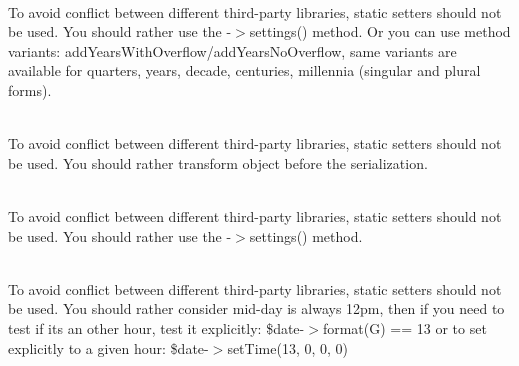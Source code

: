 \begin{DoxyRefList}
\item[Member \doxylink{interface_carbon_1_1_carbon_interface_a6b0e0698748ebda8abd75ff2f13ab6ce}{Carbon\textbackslash{}Carbon\+Interface\+::reset\+Years\+Overflow} ()]\hfill \\
\label{deprecated__deprecated000134}%
%
To avoid conflict between different third-\/party libraries, static setters should not be used. You should rather use the -\/\texorpdfstring{$>$}{>}settings() method. Or you can use method variants\+: add\+Years\+With\+Overflow/add\+Years\+No\+Overflow, same variants are available for quarters, years, decade, centuries, millennia (singular and plural forms).  
\item[Member \doxylink{interface_carbon_1_1_carbon_interface_ad11927fc9de740ed729033472876cabe}{Carbon\textbackslash{}Carbon\+Interface\+::serialize\+Using} (callable\texorpdfstring{$\vert$}{|}string\texorpdfstring{$\vert$}{|}null \$format)]\hfill \\
\label{deprecated__deprecated000135}%
%
To avoid conflict between different third-\/party libraries, static setters should not be used. You should rather transform  object before the serialization. 
\item[Member \doxylink{interface_carbon_1_1_carbon_interface_a15ec38422180371cffda0a49cc6030cd}{Carbon\textbackslash{}Carbon\+Interface\+::set\+Human\+Diff\+Options} (int \$human\+Diff\+Options)]\hfill \\
\label{deprecated__deprecated000136}%
%
To avoid conflict between different third-\/party libraries, static setters should not be used. You should rather use the -\/\texorpdfstring{$>$}{>}settings() method.  
\item[Member \doxylink{interface_carbon_1_1_carbon_interface_a66473431addd3c293df423ba81f0ee54}{Carbon\textbackslash{}Carbon\+Interface\+::set\+Mid\+Day\+At} (\$hour)]\hfill \\
\label{deprecated__deprecated000137}%
%
To avoid conflict between different third-\/party libraries, static setters should not be used. You should rather consider mid-\/day is always 12pm, then if you need to test if it\textquotesingle{}s an other hour, test it explicitly\+: \$date-\/\texorpdfstring{$>$}{>}format(\textquotesingle{}G\textquotesingle{}) == 13 or to set explicitly to a given hour\+: \$date-\/\texorpdfstring{$>$}{>}set\+Time(13, 0, 0, 0) 

\end{DoxyRefList}
